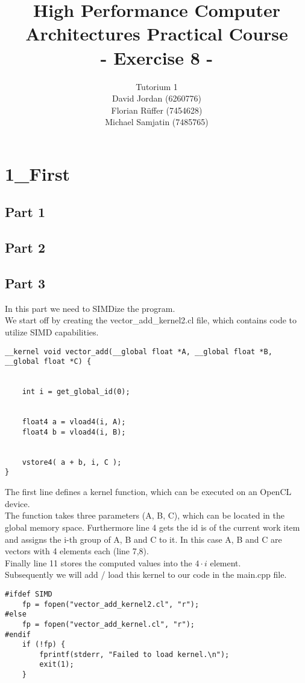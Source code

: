 \documentclass{article}
\title{\textbf{High Performance Computer Architectures Practical Course \\ - Exercise 8 -} \\[10mm]}
\author{Tutorium 1 \\[10mm] David Jordan (6260776) \\[1mm] Florian Rüffer (7454628) \\[1mm] Michael Samjatin (7485765) \\[10mm]}
\begin{document}
\maketitle
\newpage
\section*{1\_First}
\subsection*{Part 1}
\subsection*{Part 2}
\subsection*{Part 3}
In this part we need to SIMDize the program. \\
We start off by creating the vector\_add\_kernel2.cl file,
which contains code to utilize SIMD capabilities.

\begin{lstlisting}[caption=vector\_add\_kernel2.cl]
    __kernel void vector_add(__global float *A, __global float *B, __global float *C) {
    
    
    int i = get_global_id(0);

    
    float4 a = vload4(i, A);
    float4 b = vload4(i, B);

    
    vstore4( a + b, i, C );
}
\end{lstlisting}

\noindent The first line defines a kernel function, which can be executed on an OpenCL device. \\
The function takes three parameters (A, B, C), which can be located in the global memory space.
Furthermore line 4 gets the id is of the current work item and assigns the i-th group of A, B and C to it.
In this case A, B and C are vectors with 4 elements each (line 7,8). \\
Finally line 11 stores the computed values into the $4 \cdot i$ element. \\
\newpage
\noindent Subsequently we will add / load this kernel to our code in the main.cpp file.

\begin{lstlisting}[caption=main.cpp]
#ifdef SIMD
    fp = fopen("vector_add_kernel2.cl", "r");
#else
    fp = fopen("vector_add_kernel.cl", "r");
#endif
    if (!fp) {
        fprintf(stderr, "Failed to load kernel.\n");
        exit(1);
    }
\end{lstlisting}
\end{document}
